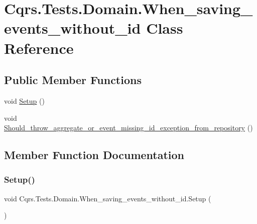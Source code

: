 \hypertarget{classCqrs_1_1Tests_1_1Domain_1_1When__saving__events__without__id}{}\section{Cqrs.\+Tests.\+Domain.\+When\+\_\+saving\+\_\+events\+\_\+without\+\_\+id Class Reference}
\label{classCqrs_1_1Tests_1_1Domain_1_1When__saving__events__without__id}
\subsection*{Public Member Functions}
\begin{DoxyCompactItemize}
\item 
void \hyperlink{classCqrs_1_1Tests_1_1Domain_1_1When__saving__events__without__id_a3379aa02c949bd22246c0ba76ef2bfe4_a3379aa02c949bd22246c0ba76ef2bfe4}{Setup} ()
\item 
void \hyperlink{classCqrs_1_1Tests_1_1Domain_1_1When__saving__events__without__id_a1886f7abc2500eab3e293f1cdcc5b0b4_a1886f7abc2500eab3e293f1cdcc5b0b4}{Should\+\_\+throw\+\_\+aggregate\+\_\+or\+\_\+event\+\_\+missing\+\_\+id\+\_\+exception\+\_\+from\+\_\+repository} ()
\end{DoxyCompactItemize}


\subsection{Member Function Documentation}
\mbox{\label{classCqrs_1_1Tests_1_1Domain_1_1When__saving__events__without__id_a3379aa02c949bd22246c0ba76ef2bfe4_a3379aa02c949bd22246c0ba76ef2bfe4}} 
\subsubsection{\texorpdfstring{Setup()}{Setup()}}
{\footnotesize\ttfamily void Cqrs.\+Tests.\+Domain.\+When\+\_\+saving\+\_\+events\+\_\+without\+\_\+id.\+Setup (\begin{DoxyParamCaption}{ }\end{DoxyParamCaption})}

